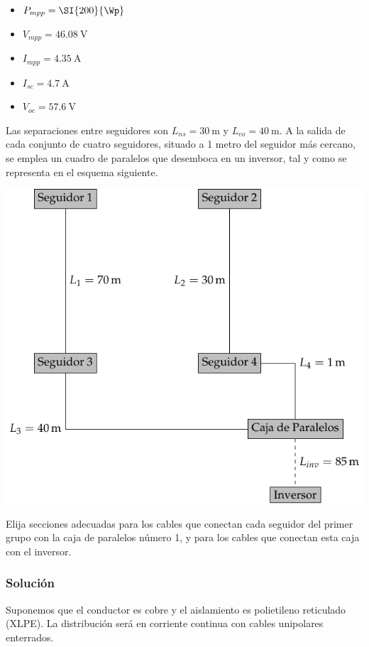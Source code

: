 \begin{itemize}
\item $P_{mpp}=\SI{200}{\Wp}$
\item $V_{mpp}=\SI{46.08}{\volt}$
\item $I_{mpp}=\SI{4.35}{\ampere}$
\item $I_{sc}=\SI{4.7}{\ampere}$
\item $V_{oc}=\SI{57.6}{\volt}$
\end{itemize}


Las separaciones entre seguidores son $L_{ns}=\SI{30}{\metre}$ y
$L_{eo}=\SI{40}{\metre}$. A la salida de cada conjunto de cuatro
seguidores, situado a 1 metro del seguidor más cercano, 
se emplea un cuadro de paralelos que desemboca en un
inversor, tal y como se representa en el esquema siguiente.

\begin{center}
\includegraphics{../figs/EjercicioUbicacionSeguidores}  
\end{center}


Elija secciones adecuadas para los cables que conectan cada seguidor del
primer grupo con la caja de paralelos número 1, y para los cables que
conectan esta caja con el inversor.

\subsubsection{Solución}

Suponemos que el conductor es cobre y el aislamiento es polietileno
reticulado (XLPE). La distribución será en corriente continua con
cables unipolares enterrados.

